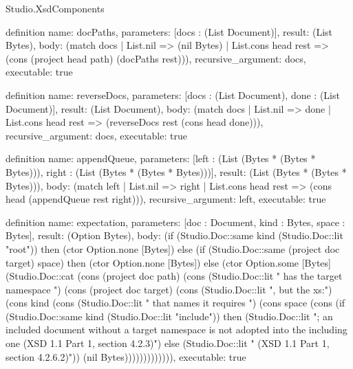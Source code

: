 \begin{lexlean}{Studio.XsdComponents}
\begin{semanticmodule}
definition{
  name: docPaths,
  parameters: [docs : (List Document)],
  result: (List Bytes),
  body: (match docs
    | List.nil => (nil Bytes)
    | List.cons head rest => (cons (project head path) (docPaths rest))),
  recursive_argument: docs,
  executable: true
}

definition{
  name: reverseDocs,
  parameters: [docs : (List Document), done : (List Document)],
  result: (List Document),
  body: (match docs
    | List.nil => done
    | List.cons head rest => (reverseDocs rest (cons head done))),
  recursive_argument: docs,
  executable: true
}

definition{
  name: appendQueue,
  parameters: [left : (List (Bytes * (Bytes * Bytes))), right : (List (Bytes * (Bytes * Bytes)))],
  result: (List (Bytes * (Bytes * Bytes))),
  body: (match left
    | List.nil => right
    | List.cons head rest => (cons head (appendQueue rest right))),
  recursive_argument: left,
  executable: true
}

definition{
  name: expectation,
  parameters: [doc : Document, kind : Bytes, space : Bytes],
  result: (Option Bytes),
  body: (if (Studio.Doc::same kind (Studio.Doc::lit "root")) then (ctor Option.none [Bytes]) else (if (Studio.Doc::same (project doc target) space) then (ctor Option.none [Bytes]) else (ctor Option.some [Bytes] (Studio.Doc::cat (cons (project doc path) (cons (Studio.Doc::lit " has the target namespace ") (cons (project doc target) (cons (Studio.Doc::lit ", but the xs:") (cons kind (cons (Studio.Doc::lit " that names it requires ") (cons space (cons (if (Studio.Doc::same kind (Studio.Doc::lit "include")) then (Studio.Doc::lit "; an included document without a target namespace is not adopted into the including one (XSD 1.1 Part 1, section 4.2.3)") else (Studio.Doc::lit " (XSD 1.1 Part 1, section 4.2.6.2)")) (nil Bytes))))))))))))),
  executable: true
}


\end{semanticmodule}
\end{lexlean}

